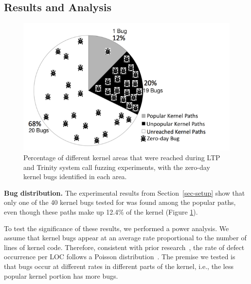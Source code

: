\subsection{Results and Analysis}
\label{Verification-of-Hypothesis}
\begin{figure}
\centering
\includegraphics[width=1.0\columnwidth]{diagram/popular_paths.png}
\caption{\small Percentage of different kernel areas that were reached during
 LTP and Trinity system call fuzzing experiments, with the zero-day kernel bugs identified
 in each area.}
\label{fig:coverage}
\end{figure}

{\bf Bug distribution.}
The experimental results from Section~\ref{sec-setup} show that only one of the 40 kernel bugs
tested for was found among the popular paths, even though these paths make up 12.4\% of the kernel
(Figure \ref{fig:coverage}).

To test the significance of these results, we performed a power analysis.
%
We assume that kernel bugs appear at an average rate proportional to the
number of lines of kernel code.
Therefore, consistent with prior research~\cite{mayer1989probability}, the
rate of defect occurrence per LOC follows a Poisson
distribution~\cite{Poisson-distribution}.
The premise we tested is that bugs occur at different rates in different
parts of the kernel, i.e., the less popular kernel portion has more bugs.

